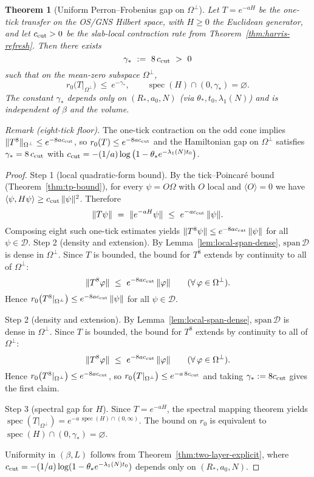 \documentclass[11pt]{amsart}
\theoremstyle{plain}
\newtheorem{theorem}{Theorem}[section]
\theoremstyle{definition}
\theoremstyle{remark}
\begin{document}
\begin{theorem}[Uniform Perron--Frobenius gap on $\Omega^{\perp}$]\label{thm:pf-gap-meanzero}
Let $T=e^{-aH}$ be the one-tick transfer on the OS/GNS Hilbert space, with $H\ge 0$ the Euclidean generator, and let $c_{\rm cut}>0$ be the slab-local contraction rate from Theorem~\ref{thm:harris-refresh}. Then there exists
\[
  \gamma_*\ :=\ 8\,c_{\rm cut}\ >\ 0
\]
such that on the mean-zero subspace $\Omega^{\perp}$,
\[
  r_0\bigl(T|_{\Omega^{\perp}}\bigr)\ \le\ e^{-\gamma_*},\qquad
  \operatorname{spec}(H)\cap(0,\gamma_*)=\varnothing.
\]
The constant $\gamma_*$ depends only on $(R_*,a_0,N)$ (via $\theta_*,t_0,\lambda_1(N)$) and is independent of $\beta$ and the volume.
\end{theorem}
\noindent\emph{Remark (eight-tick floor).} The one-tick contraction on the odd cone implies $\|T^8\|_{\Omega^{\perp}}\le e^{-8 a c_{\rm cut}}$, so $r_0(T)\le e^{-8 a c_{\rm cut}}$ and the Hamiltonian gap on $\Omega^{\perp}$ satisfies $\gamma_* = 8\,c_{\rm cut}$ with $c_{\rm cut}=-(1/a)\log\big(1-\theta_* e^{-\lambda_1(N) t_0}\big)$.

\begin{proof}
Step 1 (local quadratic-form bound). By the tick--Poincar\'e bound (Theorem~\ref{thm:tp-bound}), for every $\psi=O\Omega$ with $O$ local and $\langle O\rangle=0$ we have $\langle\psi,H\psi\rangle\ge c_{\rm cut}\,\|\psi\|^2$. Therefore
\[
  \|T\psi\|\ =\ \|e^{-aH}\psi\|\ \le\ e^{-a c_{\rm cut}}\,\|\psi\|.
\]
Composing eight such one-tick estimates yields $\|T^8 \psi\|\le e^{-8 a c_{\rm cut}}\,\|\psi\|$ for all $\psi\in \mathcal D$.
Step 2 (density and extension). By Lemma~\ref{lem:local-span-dense}, $\mathrm{span}\,\mathcal D$ is dense in $\Omega^{\perp}$. Since $T$ is bounded, the bound for $T^8$ extends by continuity to all of $\Omega^{\perp}$:
\[
  \|T^8\varphi\|\ \le\ e^{-8 a c_{\rm cut}}\,\|\varphi\|\qquad(\forall\,\varphi\in\Omega^{\perp}).
\]
Hence $r_0\bigl(T^8|_{\Omega^{\perp}}\bigr)\le e^{-8 a c_{\rm cut}}\,\|\psi\|$ for all $\psi\in \mathcal D$.

Step 2 (density and extension). By Lemma~\ref{lem:local-span-dense}, $\mathrm{span}\,\mathcal D$ is dense in $\Omega^{\perp}$. Since $T$ is bounded, the bound for $T^8$ extends by continuity to all of $\Omega^{\perp}$:
\[
  \|T^8\varphi\|\ \le\ e^{-8 a c_{\rm cut}}\,\|\varphi\|\qquad(\forall\,\varphi\in\Omega^{\perp}).
\]
Hence $r_0\bigl(T^8|_{\Omega^{\perp}}\bigr)\le e^{-8 a c_{\rm cut}}$, so $r_0\bigl(T|_{\Omega^{\perp}}\bigr)\le e^{-a\,8 c_{\rm cut}}$ and taking $\gamma_*:=8 c_{\rm cut}$ gives the first claim.

Step 3 (spectral gap for $H$). Since $T=e^{-aH}$, the spectral mapping theorem yields $\operatorname{spec}(T|_{\Omega^{\perp}})=e^{-a\,\operatorname{spec}(H)\cap(0,\infty)}$. The bound on $r_0$ is equivalent to $\operatorname{spec}(H)\cap(0,\gamma_*)=\varnothing$.

Uniformity in $(\beta,L)$ follows from Theorem~\ref{thm:two-layer-explicit}, where $c_{\rm cut}=-(1/a)\log(1-\theta_* e^{-\lambda_1(N)t_0})$ depends only on $(R_*,a_0,N)$.
\end{proof}
\end{document}
